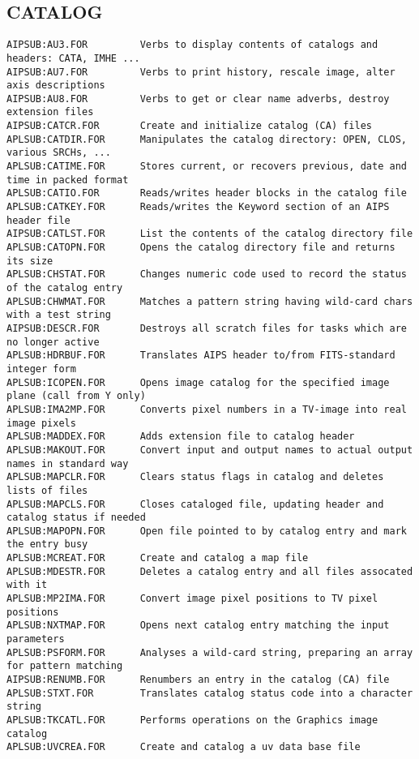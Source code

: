 \subsection{CATALOG}
\begin{verbatim}
AIPSUB:AU3.FOR         Verbs to display contents of catalogs and headers: CATA, IMHE ...
AIPSUB:AU7.FOR         Verbs to print history, rescale image, alter axis descriptions
AIPSUB:AU8.FOR         Verbs to get or clear name adverbs, destroy extension files
AIPSUB:CATCR.FOR       Create and initialize catalog (CA) files
APLSUB:CATDIR.FOR      Manipulates the catalog directory: OPEN, CLOS, various SRCHs, ...
APLSUB:CATIME.FOR      Stores current, or recovers previous, date and time in packed format
APLSUB:CATIO.FOR       Reads/writes header blocks in the catalog file
APLSUB:CATKEY.FOR      Reads/writes the Keyword section of an AIPS header file
AIPSUB:CATLST.FOR      List the contents of the catalog directory file
APLSUB:CATOPN.FOR      Opens the catalog directory file and returns its size
APLSUB:CHSTAT.FOR      Changes numeric code used to record the status of the catalog entry
APLSUB:CHWMAT.FOR      Matches a pattern string having wild-card chars with a test string
AIPSUB:DESCR.FOR       Destroys all scratch files for tasks which are no longer active
APLSUB:HDRBUF.FOR      Translates AIPS header to/from FITS-standard integer form
APLSUB:ICOPEN.FOR      Opens image catalog for the specified image plane (call from Y only)
APLSUB:IMA2MP.FOR      Converts pixel numbers in a TV-image into real image pixels
APLSUB:MADDEX.FOR      Adds extension file to catalog header
APLSUB:MAKOUT.FOR      Convert input and output names to actual output names in standard way
APLSUB:MAPCLR.FOR      Clears status flags in catalog and deletes lists of files
APLSUB:MAPCLS.FOR      Closes cataloged file, updating header and catalog status if needed
APLSUB:MAPOPN.FOR      Open file pointed to by catalog entry and mark the entry busy
APLSUB:MCREAT.FOR      Create and catalog a map file
APLSUB:MDESTR.FOR      Deletes a catalog entry and all files assocated with it
APLSUB:MP2IMA.FOR      Convert image pixel positions to TV pixel positions
APLSUB:NXTMAP.FOR      Opens next catalog entry matching the input parameters
APLSUB:PSFORM.FOR      Analyses a wild-card string, preparing an array for pattern matching
AIPSUB:RENUMB.FOR      Renumbers an entry in the catalog (CA) file
APLSUB:STXT.FOR        Translates catalog status code into a character string
APLSUB:TKCATL.FOR      Performs operations on the Graphics image catalog
APLSUB:UVCREA.FOR      Create and catalog a uv data base file
\end{verbatim}
 
